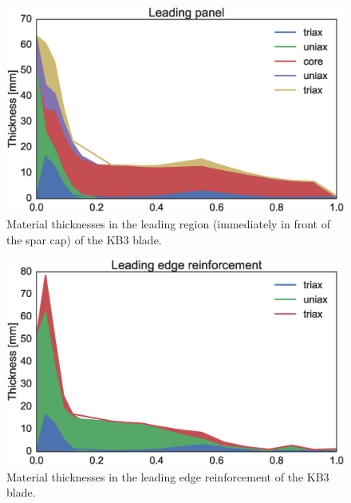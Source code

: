 \begin{figure}[!ht]
\begin{center}
	\includegraphics[width=.85\linewidth]{figures/KB3_region06.eps}
\end{center}
\caption{Material thicknesses in the leading region (immediately in front of the spar cap) of the KB3 blade.}
\label{fig:KB3matstackr06}
\end{figure}

\begin{figure}[!ht]
\begin{center}
	\includegraphics[width=.85\linewidth]{figures/KB3_region07.eps}
\end{center}
\caption{Material thicknesses in the leading edge reinforcement of the KB3 blade.}
\label{fig:KB3matstackr07}
\end{figure}

